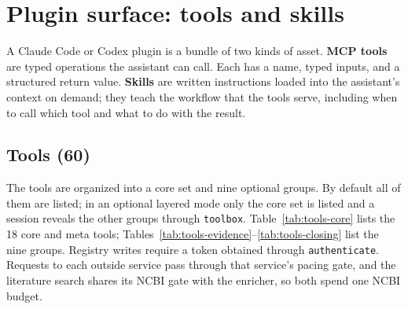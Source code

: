 \documentclass[11pt,a4paper]{article}
\begin{document}
\section{Plugin surface: tools and skills}
\label{app:tools}

A Claude Code or Codex plugin is a bundle of two kinds of asset. \textbf{MCP
tools} are typed operations the assistant can call. Each has a name, typed
inputs, and a structured return value. \textbf{Skills} are written
instructions loaded into the assistant's context on demand; they teach the
workflow that the tools serve, including when to call which tool and what to
do with the result.

\subsection*{Tools (60)}

The tools are organized into a core set and nine optional groups. By
default all of them are listed; in an optional layered mode only the core set
is listed and a session reveals the other groups through \texttt{toolbox}.
Table~\ref{tab:tools-core} lists the 18 core and meta tools;
Tables~\ref{tab:tools-evidence}--\ref{tab:tools-closing} list the nine
groups. Registry writes require a token obtained through
\texttt{authenticate}. Requests to each outside service pass
through that service's pacing gate, and the literature search shares its NCBI
gate with the enricher, so both spend one NCBI budget.
\end{document}
